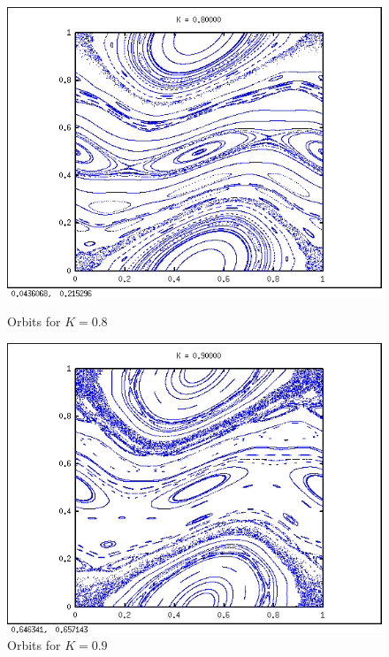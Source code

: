 \documentclass{article}
\begin{document}
\begin{figure}[h!]
\centering
\begin{minipage}{0.5\textwidth}
\centering
\includegraphics[width=\textwidth]{k08.png}
\caption{Orbits for $K = 0.8$}
\end{minipage}\hfill
\begin{minipage}{0.5\textwidth}
\centering
\includegraphics[width=\textwidth]{k09.png}
\caption{Orbits for $K = 0.9$}
\end{minipage}
\end{figure}
\end{document}
